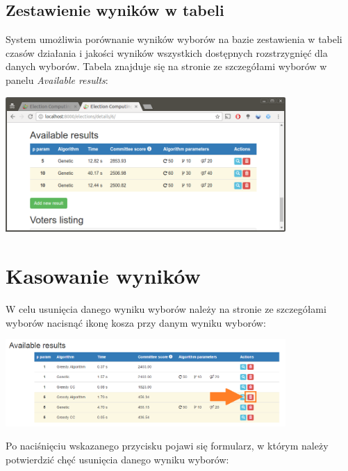 \documentclass[pdflatex,11pt]{../aghdoc_version2}
\begin{document}
\newpage
\subsection{Zestawienie wyników w tabeli}
\label{subsec:tabelazwynikami}

System umożliwia porównanie wyników wyborów na bazie zestawienia w tabeli czasów działania i jakości wyników wszystkich dostępnych rozstrzygnięć dla danych wyborów. Tabela znajduje się na stronie ze szczegółami wyborów w panelu \textit{Available results}: \\

\begin{center}
\includegraphics[width=0.8\textwidth]{pics/results-on-table.png}
\end{center}

\section{Kasowanie wyników}
\label{sec:kasowaniewynikow}
W celu usunięcia danego wyniku wyborów należy na stronie ze szczegółami wyborów nacisnąć ikonę kosza przy danym wyniku wyborów: \\

\begin{center}
\includegraphics[width=0.8\textwidth]{pics/delete_result_button.png}
\end{center}

\newpage
Po naciśnięciu wskazanego przycisku pojawi się formularz, w którym należy potwierdzić chęć usunięcia danego wyniku wyborów: \\
\end{document}
